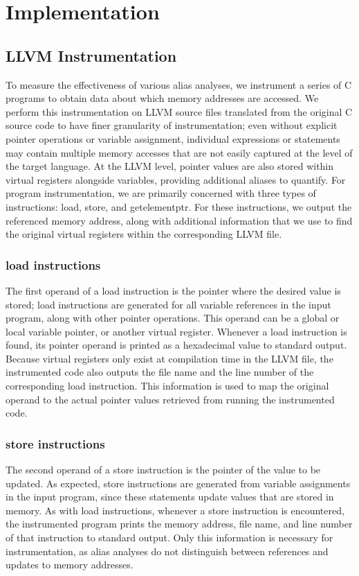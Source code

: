 \chapter{Implementation}

\section{LLVM Instrumentation}
To measure the effectiveness of various alias analyses, we instrument a series of C programs to obtain data about which memory addresses are accessed. We perform this instrumentation on LLVM source files translated from the original C source code to have finer granularity of instrumentation; even without explicit pointer operations or variable assignment, individual expressions or statements may contain multiple memory accesses that are not easily captured at the level of the target language. At the LLVM level, pointer values are also stored within virtual registers alongside variables, providing additional aliases to quantify. For program instrumentation, we are primarily concerned with three types of instructions: load, store, and getelementptr. For these instructions, we output the referenced memory address, along with additional information that we use to find the original virtual registers within the corresponding LLVM file.

\subsection{load instructions}
The first operand of a load instruction is the pointer where the desired value is stored; load instructions are generated for all variable references in the input program, along with other pointer operations. This operand can be a global or local variable pointer, or another virtual register. Whenever a load instruction is found, its pointer operand is printed as a hexadecimal value to standard output. Because virtual registers only exist at compilation time in the LLVM file, the instrumented code also outputs the file name and the line number of the corresponding load instruction. This information is used to map the original operand to the actual pointer values retrieved from running the instrumented code.

\subsection{store instructions}
The second operand of a store instruction is the pointer of the value to be updated. As expected, store instructions are generated from variable assignments in the input program, since these statements update values that are stored in memory. As with load instructions, whenever a store instruction is encountered, the instrumented program prints the memory address, file name, and line number of that instruction to standard output. Only this information is necessary for instrumentation, as alias analyses do not distinguish between references and updates to memory addresses.

